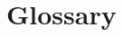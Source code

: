 \documentclass[a4paper]{article}
\newcommand*\features{}
\begin{document}

\section{Glossary}
\begin{multicols}{4}
\features
\end{multicols}


\end{document}
